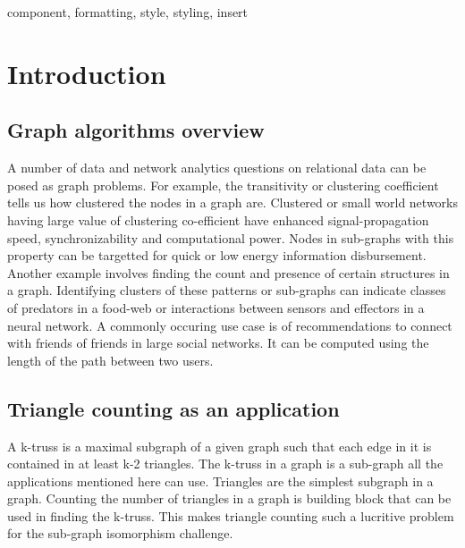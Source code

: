 \documentclass[conference]{IEEEtran}
\begin{document}
\begin{IEEEkeywords}
component, formatting, style, styling, insert
\end{IEEEkeywords}

\section{Introduction}
\subsection{Graph algorithms overview}
A number of data and network analytics questions on relational data can be posed as graph problems. For example, the transitivity or clustering coefficient tells us how clustered the nodes in a graph are. Clustered or small world networks having large value of clustering co-efficient have enhanced signal-propagation speed, synchronizability and computational power\cite{b1}. Nodes in sub-graphs with this property can be targetted for quick or low energy information disbursement. Another example involves finding the count and presence of certain structures in a graph. Identifying clusters of these patterns\cite{b2} or sub-graphs can indicate classes of predators in a food-web or interactions between sensors and effectors in a neural network\cite{b3}. A commonly occuring use case is of recommendations to connect with friends of friends in large social networks. It can be computed using the length of the path between two users\cite{b4}.
\subsection{Triangle counting as an application}
A k-truss is a maximal subgraph of a given graph such that each edge in it is contained in at least k-2 triangles. The k-truss in a graph is a sub-graph all the applications mentioned here can use. Triangles are the simplest subgraph in a graph. Counting the number of triangles in a graph is building block that can be used in finding the k-truss\cite{b5}. This makes triangle counting such a lucritive problem for the sub-graph isomorphism challenge\cite{b6}.
\end{document}
